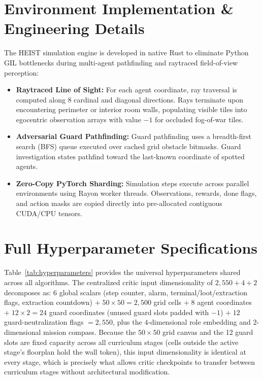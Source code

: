
\section{Environment Implementation \& Engineering Details}
\label{sec:app_env}
The HEIST simulation engine is developed in native Rust to eliminate Python GIL bottlenecks during multi-agent pathfinding and raytraced field-of-view perception:
\begin{itemize}[leftmargin=*,nosep]
    \item \textbf{Raytraced Line of Sight:} For each agent coordinate, ray traversal is computed along 8 cardinal and diagonal directions. Rays terminate upon encountering perimeter or interior room walls, populating visible tiles into egocentric observation arrays with value $-1$ for occluded fog-of-war tiles.
    \item \textbf{Adversarial Guard Pathfinding:} Guard pathfinding uses a breadth-first search (BFS) queue executed over cached grid obstacle bitmasks. Guard investigation states pathfind toward the last-known coordinate of spotted agents.
    \item \textbf{Zero-Copy PyTorch Sharding:} Simulation steps execute across parallel environments using Rayon worker threads. Observations, rewards, done flags, and action masks are copied directly into pre-allocated contiguous CUDA/CPU tensors.
\end{itemize}

\section{Full Hyperparameter Specifications}
\label{sec:app_hyperparameters}
Table~\ref{tab:hyperparameters} provides the universal hyperparameters shared across all algorithms. The centralized critic input dimensionality of $2,\!550 + 4 + 2$ decomposes as: $6$ global scalars (step counter, alarm, terminal/loot/extraction flags, extraction countdown) $+\; 50 \times 50 = 2,\!500$ grid cells $+\; 8$ agent coordinates $+\; 12 \times 2 = 24$ guard coordinates (unused guard slots padded with $-1$) $+\; 12$ guard-neutralization flags $= 2,\!550$, plus the $4$-dimensional role embedding and $2$-dimensional mission compass. Because the $50 \times 50$ grid canvas and the 12 guard slots are fixed capacity across all curriculum stages (cells outside the active stage's floorplan hold the wall token), this input dimensionality is identical at every stage, which is precisely what allows critic checkpoints to transfer between curriculum stages without architectural modification.

